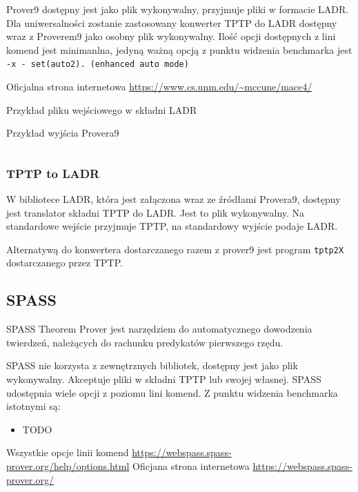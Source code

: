 \documentclass[a4paper,12pt]{article}
\newenvironment{longlisting}{\captionsetup{type=listing}}{}
\begin{document}
Prover9 dostępny jest jako plik wykonywalny, przyjmuje pliki w formacie \gls{LADR}. Dla uniwersalności zostanie zastosowany konwerter TPTP do LADR dostępny wraz z Proverem9 jako osobny plik wykonywalny. Ilość opcji dostępnych z lini komend jest minimanlna, jedyną ważną opcją z punktu widzenia benchmarka jest \texttt{-x - set(auto2).  (enhanced auto mode)}

\noindent
Oficjalna strona internetowa \url{https://www.cs.unm.edu/~mccune/mace4/}

\begin{longlisting}
  \caption{Przykład pliku wejściowego w składni LADR}
\end{longlisting}

\begin{longlisting}
  \caption{Przykład wyjścia Provera9}
  \inputminted{text}{listings/prover9_example.out}
\end{longlisting}

\subsubsection{TPTP to LADR}

W bibliotece \gls{LADR}, która jest załączona wraz ze źródłami Provera9, dostępny jest translator składni TPTP do LADR. Jest to plik wykonywalny. Na standardowe wejście przyjmuje TPTP, na standardowy wyjście podaje LADR.

Alternatywą do konwertera dostarczanego razem z prover9 jest program \texttt{tptp2X} dostarczanego przez TPTP.

\subsection{SPASS}

SPASS Theorem Prover jest narzędziem do automatycznego dowodzenia twierdzeń, należących do rachunku predykatów pierwszego rzędu.

SPASS nie korzysta z zewnętrznych bibliotek, dostępny jest jako plik wykonywalny. Akceptuje pliki w składni TPTP lub swojej własnej. SPASS udostępnia wiele opcji z poziomu lini komend. Z punktu widzenia benchmarka istotnymi są:

\begin{itemize}
  \item TODO
\end{itemize}

\noindent
Wszystkie opcje linii komend \url{https://webspass.spass-prover.org/help/options.html}
\noindent \newline
Oficjana strona internetowa \url{https://webspass.spass-prover.org/}
\end{document}
